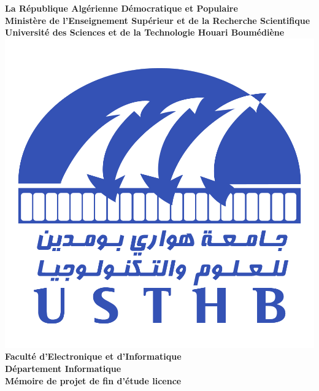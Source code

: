 \documentclass[a4paper,12pt]{article}
\begin{document}
\begin{titlepage}
\begin{center}
{\bfseries 
La République Algérienne Démocratique et Populaire\\[0.1cm]
Ministère de l'Enseignement Supérieur et de la Recherche Scientifique\\[0.1cm]
Université des Sciences et de la Technologie Houari Boumédiène\\[0.5cm]

\includegraphics[scale=0.5]{resources/USTHB_Logo.png}\\[1cm]
\Large
Faculté d’Electronique et d’Informatique\\[0,1cm]
Département Informatique\\[0,1cm]
Mémoire de projet de fin d'étude licence\\[0.5cm]

}
\end{center}
\end{titlepage}
\end{document}
